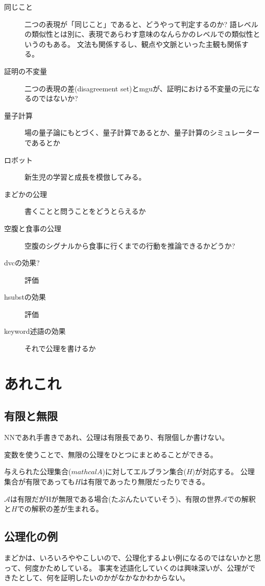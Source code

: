 \documentclass[10pt, oneside]{jarticle}   	%
\begin{document}
\begin{description}
\item[同じこと] 二つの表現が「同じこと」であると、どうやって判定するのか?
語レベルの類似性とは別に、表現であらわす意味のなんらかのレベルでの類似性というのもある。
文法も関係するし、観点や文脈といった主観も関係する。

\item[ 証明の不変量] 二つの表現の差(disagreement set)とmguが、証明における不変量の元になるのではないか?

\item[量子計算] 場の量子論にもとづく、量子計算であるとか、量子計算のシミュレーターであるとか

\item[ロボット] 新生児の学習と成長を模倣してみる。

\item[ まどかの公理] 書くことと問うことをどうとらえるか 
\item[ 空腹と食事の公理] 空腹のシグナルから食事に行くまでの行動を推論できるかどうか?

\item[ dvcの効果?] 評価
\item[ hsubstの効果] 評価
\item[ keyword述語の効果] それで公理を書けるか
\end{description}

\section{あれこれ}
\subsection{有限と無限}
NNであれ手書きであれ、公理は有限長であり、有限個しか書けない。

変数を使うことで、無限の公理をひとつにまとめることができる。

与えられた公理集合($mathcal{A}$)に対してエルブラン集合($H$)が対応する。
公理集合が有限であっても$H$は有限であったり無限だったりできる。

$\mathcal{A}$は有限だがHが無限である場合(たぶんたいていそう)、有限の世界$\mathcal{A}$での解釈と$H$での解釈の差が生まれる。

\subsection{公理化の例}
まどかは、いろいろややこしいので、公理化するよい例になるのではないかと思って、何度かためしている。
事実を述語化していくのは興味深いが、公理ができたとして、何を証明したいのかがなかなかわからない。
\end{document}
